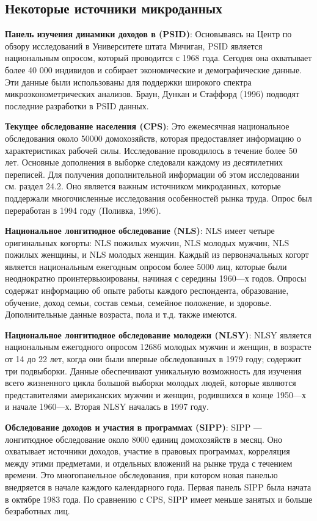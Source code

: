 \subsection{Некоторые источники микроданных}

{\bf Панель изучения динамики доходов в (PSID)}: Основываясь на Центр по обзору исследований в Университете штата Мичиган, PSID является национальным опросом, который проводится с 1968 года. Сегодня она охватывает более 40 000 индивидов и собирает экономические и демографические данные. Эти данные были использованы для поддержки широкого спектра микроэконометрических анализов. Браун, Дункан и Стаффорд (1996) подводят последние разработки в PSID данных.


{\bf Текущее обследование населения (CPS)}: Это ежемесячная национальное обследования около 50000 домохозяйств, которая предоставляет информацию о характеристиках рабочей силы. Исследование проводилось в течение более 50 лет. Основные дополнения в выборке следовали каждому из десятилетних переписей. Для получения дополнительной информации об этом исследовании см. раздел 24.2. Оно является важным источником микроданных, которые поддержали многочисленные исследования особенностей рынка труда. Опрос был переработан в 1994 году (Поливка, 1996).


{\bf Национальное лонгитюдное обследование (NLS)}: NLS имеет четыре оригинальных когорты: NLS пожилых мужчин, NLS молодых мужчин, NLS пожилых женщины, и NLS молодых женщин. Каждый из первоначальных когорт является национальным ежегодным опросом более 5000 лиц, которые были неоднократно проинтервьюированы, начиная с середины 1960---х годов. Опросы содержат информацию об опыте работы каждого респондента, образование, обучение, доход семьи, состав семьи, семейное положение, и здоровье. Дополнительные данные возраста, пола и т.д. также имеются.


{\bf Национальное лонгитюдное обследование молодежи (NLSY)}: NLSY является национальным ежегодного опросом 12686 молодых мужчин и женщин, в возрасте от 14 до 22 лет, когда они были впервые обследованных в 1979 году; содержит три подвыборки. Данные обеспечивают уникальную возможность для изучения всего жизненного цикла большой выборки молодых людей, которые являются представителями американских мужчин и женщин, родившихся в конце 1950---х и начале 1960---х. Вторая NLSY началась в 1997 году.


{\bf Обследование доходов и участия в программах (SIPP)}: SIPP --- лонгитюдное обследование около 8000 единиц домохозяйств в месяц. Оно охватывает источники доходов, участие в правовых программах, корреляция между этими предметами, и отдельных вложений на рынке труда с течением времени. Это многопанельное обследования, при котором новая панелью внедряется в начале каждого календарного года. Первая панель SIPP была начата в октябре 1983 года. По сравнению с CPS, SIPP имеет меньше занятых и больше безработных лиц.


